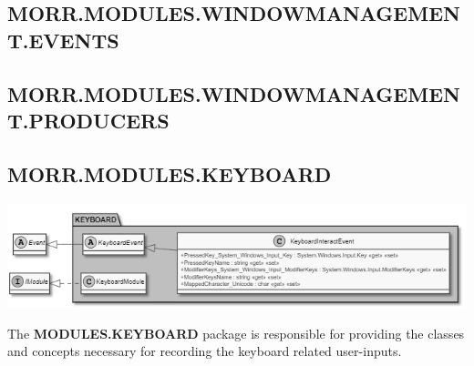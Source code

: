 \begin{packclass}
\end{packclass}

\begin{packpack}
\end{packpack}

\subsection*{MORR.MODULES.WINDOWMANAGEMENT.EVENTS}
\begin{packclass}
\end{packclass}

\subsection*{MORR.MODULES.WINDOWMANAGEMENT.PRODUCERS}
\begin{packclass}
\end{packclass}
\newpage

\subsection*{MORR.MODULES.KEYBOARD}

\begin{center}
    \includegraphics[width=1.0\textwidth]{resources/Packages/MODULES_KEYBOARD.png}
\end{center}

The \textbf{MODULES.KEYBOARD} package is responsible for providing the classes and concepts necessary for recording the keyboard related user-inputs.

\begin{packclass}
\end{packclass}

